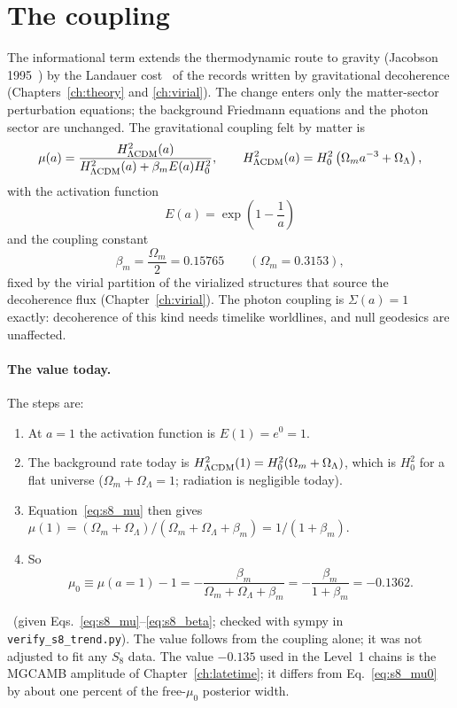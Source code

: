 \section{The coupling}\label{sec:s8_coupling}
The informational term extends the thermodynamic route to gravity (Jacobson 1995~\cite{Jacobson1995}) by the Landauer cost~\cite{Landauer1961} of the
records written by gravitational decoherence (Chapters~\ref{ch:theory} and \ref{ch:virial}). The change enters only the matter-sector perturbation
equations; the background Friedmann equations and the photon sector are unchanged. The gravitational coupling felt by matter is
\begin{equation}
\mu(a)=\frac{H^2_{\Lambda\rm CDM}(a)}{H^2_{\Lambda\rm CDM}(a)+\beta_mE(a)H_0^2},\qquad H^2_{\Lambda\rm CDM}(a)=H_0^2\left(\Omega_ma^{-3}+\Omega_\Lambda\right),
\label{eq:s8_mu}\end{equation} \derived{}
with the activation function
\begin{equation}
E(a)=\exp\!\left(1-\frac1a\right)
\label{eq:s8_Ea}\end{equation} \derived{}
and the coupling constant
\begin{equation}
\beta_m=\frac{\Omega_m}{2}=0.15765\qquad(\Omega_m=0.3153),
\label{eq:s8_beta}\end{equation} \prediction{}
fixed by the virial partition of the virialized structures that source the decoherence flux (Chapter~\ref{ch:virial}). The photon coupling is
$\Sigma(a)=1$ exactly: decoherence of this kind needs timelike worldlines, and null geodesics are unaffected.

\paragraph{The value today.} The steps are:
\begin{enumerate}
\item At $a=1$ the activation function is $E(1)=e^0=1$.
\item The background rate today is $H^2_{\Lambda\rm CDM}(1)=H_0^2(\Omega_m+\Omega_\Lambda)$, which is $H_0^2$ for a flat universe
($\Omega_m+\Omega_\Lambda=1$; radiation is negligible today).
\item Equation~\eqref{eq:s8_mu} then gives $\mu(1)=(\Omega_m+\Omega_\Lambda)/(\Omega_m+\Omega_\Lambda+\beta_m)=1/(1+\beta_m)$.
\item So
\begin{equation}
\mu_0\equiv\mu(a{=}1)-1=-\frac{\beta_m}{\Omega_m+\Omega_\Lambda+\beta_m}=-\frac{\beta_m}{1+\beta_m}=-0.1362 .
\label{eq:s8_mu0}\end{equation}
\end{enumerate}
\derived\ (given Eqs.~\ref{eq:s8_mu}--\ref{eq:s8_beta}; checked with sympy in \texttt{verify\_s8\_trend.py}). The value follows from the
coupling alone; it was not adjusted to fit any $S_8$ data. The value $-0.135$ used in the Level~1 chains is the MGCAMB amplitude of
Chapter~\ref{ch:latetime}; it differs from Eq.~\eqref{eq:s8_mu0} by about one percent of the free-$\mu_0$ posterior width.


